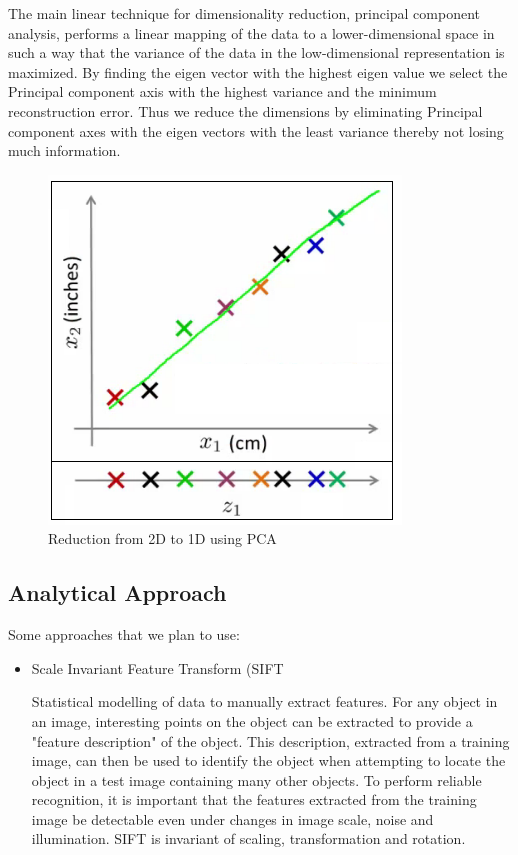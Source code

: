 \documentclass{article}
\begin{document}
\begin{multicols*}{2}
\begin{itemize}
The main linear technique for dimensionality reduction, principal component analysis, performs a linear mapping of the data to a lower-dimensional space in such a way that the variance of the data in the low-dimensional representation is maximized. By finding the eigen vector with the highest eigen value we select the Principal component axis with the highest variance and the minimum reconstruction error. Thus we reduce the dimensions by eliminating Principal component axes with the eigen vectors with the least variance thereby not losing much information.
\end{itemize}
\begin{figure}[H]
\centering
\includegraphics[scale=0.75]{pca.png}
\caption{Reduction from 2D to 1D using PCA}
\end{figure}
\subsection{Analytical Approach}

Some approaches that we plan to use: 
\begin{itemize}
\item Scale Invariant Feature Transform (SIFT

Statistical modelling of data to manually extract features. For any object in an image, interesting points on the object can be extracted to provide a "feature description" of the object. This description, extracted from a training image, can then be used to identify the object when attempting to locate the object in a test image containing many other objects. To perform reliable recognition, it is important that the features extracted from the training image be detectable even under changes in image scale, noise and illumination. SIFT is invariant of scaling, transformation and rotation.


\end{itemize}
\end{multicols*}
\end{document}
